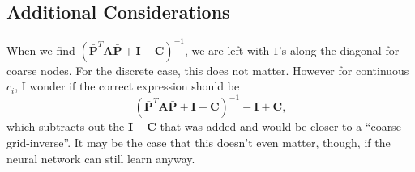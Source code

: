 \documentclass{article}
\newcommand{\mat}[1]{\bm{{#1}}}
\begin{document}
\subsection{Additional Considerations}
When we find $\left(\bar{\mat{P}}^T \mat{A} \bar{\mat{P}} + \mat{I} - \mat{C}\right)^{-1}$, we are left with $1$'s along the diagonal for coarse nodes.  For the discrete case, this does not matter.  However for continuous $c_i$, I wonder if the correct expression should be
\begin{equation}
  \left(\bar{\mat{P}}^T \mat{A} \bar{\mat{P}} + \mat{I} - \mat{C}\right)^{-1} - \mat{I} + \mat{C},
\end{equation}
which subtracts out the $\mat{I} - \mat{C}$ that was added and would be closer to a ``coarse-grid-inverse''.  It may be the case that this doesn't even matter, though, if the neural network can still learn anyway.



\end{document}
